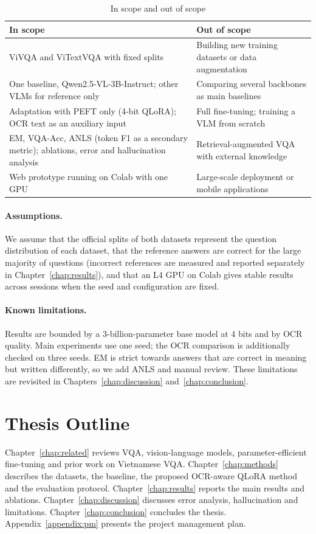 \begin{table}[htbp]
\caption{In scope and out of scope}
\label{tab:scope}
\centering
\small
\begin{tabular}{p{}p{}}
\toprule
\textbf{In scope} & \textbf{Out of scope} \\
\midrule
ViVQA and ViTextVQA with fixed splits &
Building new training datasets or data augmentation \\
One baseline, Qwen2.5-VL-3B-Instruct; other VLMs for reference only &
Comparing several backbones as main baselines \\
Adaptation with PEFT only (4-bit QLoRA); OCR text as an auxiliary input &
Full fine-tuning; training a VLM from scratch \\
EM, VQA-Acc, ANLS (token F1 as a secondary metric); ablations, error and
hallucination analysis &
Retrieval-augmented VQA with external knowledge \\
Web prototype running on Colab with one GPU &
Large-scale deployment or mobile applications \\
\bottomrule
\end{tabular}
\end{table}

\paragraph{Assumptions.} We assume that the official splits of both datasets
represent the question distribution of each dataset, that the reference answers
are correct for the large majority of questions (incorrect references are
measured and reported separately in Chapter~\ref{chap:results}), and that an L4
GPU on Colab gives stable results across sessions when the seed and
configuration are fixed.

\paragraph{Known limitations.} Results are bounded by a 3-billion-parameter
base model at 4 bits and by OCR quality. Main experiments use one seed; the OCR
comparison is additionally checked on three seeds. EM is strict towards answers
that are correct in meaning but written differently, so we add ANLS and manual
review. These limitations are revisited in Chapters~\ref{chap:discussion}
and~\ref{chap:conclusion}.

\section{Thesis Outline}
\label{sec:intro-outline}

Chapter~\ref{chap:related} reviews VQA, vision-language models,
parameter-efficient fine-tuning and prior work on Vietnamese VQA.
Chapter~\ref{chap:methods} describes the datasets, the baseline, the proposed
OCR-aware QLoRA method and the evaluation protocol. Chapter~\ref{chap:results}
reports the main results and ablations. Chapter~\ref{chap:discussion} discusses
error analysis, hallucination and limitations. Chapter~\ref{chap:conclusion}
concludes the thesis. Appendix~\ref{appendix:pm} presents the project management
plan.
